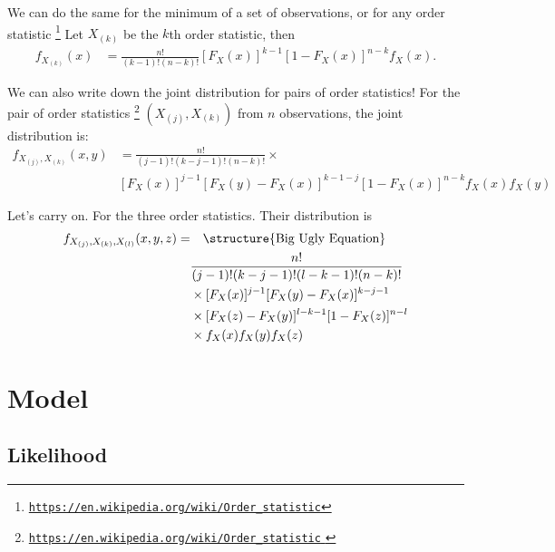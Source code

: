 \documentclass[usenames,dvipsnames]{beamer}
\begin{document}
\begin{frame}

We can do the same for the minimum of a set of observations, or for any order statistic%
\footnote{\href{https://en.wikipedia.org/wiki/Order_statistic}{\texttt{https://en.wikipedia.org/wiki/Order\_statistic}}}
Let $X_{(k)}$ be the $k$th order statistic, then
\begin{align*}
f_{X_{(k)}}(x) &=
\frac{n!}{(k-1)!(n-k)!} [F_X(x)]^{k-1} [1- F_X(x)]^{n-k} f_X(x)
\text{.}
\end{align*}

We can also write down the joint distribution for pairs of order statistics!
For the pair of order statistics%
\footnote{
\href{https://en.wikipedia.org/wiki/Order_statistic\#The_joint_distribution_of_the_order_statistics_of_an_absolutely_continuous_distribution)
}{
\texttt{https://en.wikipedia.org/wiki/Order\_statistic}
}
}
$( X_{(j)} , X_{(k)} )$
from $n$ observations, the joint distribution is:
\begin{align*}
f_{X_{(j)} , X_{(k)} }(x, y) &=
\frac{n!}{(j-1)!(k-j-1)!(n-k)!} \times \\
&
[F_X(x)]^{j-1}
[F_X(y) - F_X(x)]^{k-1-j}
[1 - F_X(x)]^{n-k}
f_X(x)
f_X(y)
\end{align*}


\end{frame}


\begin{frame}
\small
Let's carry on.
For the three order statistics.
Their distribution is
\begin{align*}
f_{X_{(j)} , X_{(k)}, X_{(l)}  }(x, y, z) = &
\quad
\text{\structure{Big Ugly Equation}}
\\
&
\frac{n!}{ (j-1)! (k-j-1)! (l-k-1)! (n-k)! } \\
& \times
[F_X(x)]^{j-1}
[F_X(y) - F_X(x)]^{k-j-1}
\\
& \times
[F_X(z) - F_X(y)]^{l-k-1}
[1 - F_X(z)]^{n-l} \\
& \times
f_X(x)
f_X(y)
f_X(z)
\end{align*}

\end{frame}



\section{Model}

\subsection{Likelihood}
\end{document}
